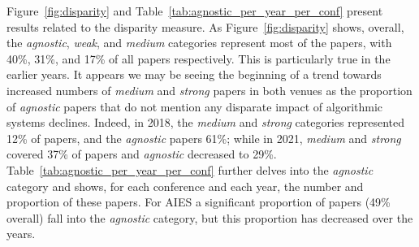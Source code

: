 \documentclass[manuscript]{acmart}
\begin{document}
Figure~\ref{fig:disparity} and Table~\ref{tab:agnostic_per_year_per_conf} present results related to the disparity measure. As Figure~\ref{fig:disparity} shows, overall, the \textit{agnostic}, \textit{weak}, and \textit{medium} categories represent most of the papers, with 40\%, 31\%, and 17\% of all papers respectively. This is particularly true in the earlier years. It appears we may be seeing the beginning of a trend towards increased numbers of \textit{medium} and \textit{strong} papers in both venues as the proportion of \textit{agnostic} papers that do not mention any disparate impact of algorithmic systems declines. Indeed, in 2018, the \textit{medium} and \textit{strong} categories represented 12\% of papers, and the \textit{agnostic} papers 61\%; while in 2021, \textit{medium} and \textit{strong} covered 37\% of papers and \textit{agnostic} decreased to 29\%. Table~\ref{tab:agnostic_per_year_per_conf} further delves into the \textit{agnostic} category and shows, for each conference and each year, the number and proportion of these papers. For AIES a significant proportion of papers (49\% overall) fall into the \textit{agnostic} category, but this proportion has decreased over the years.
\end{document}
